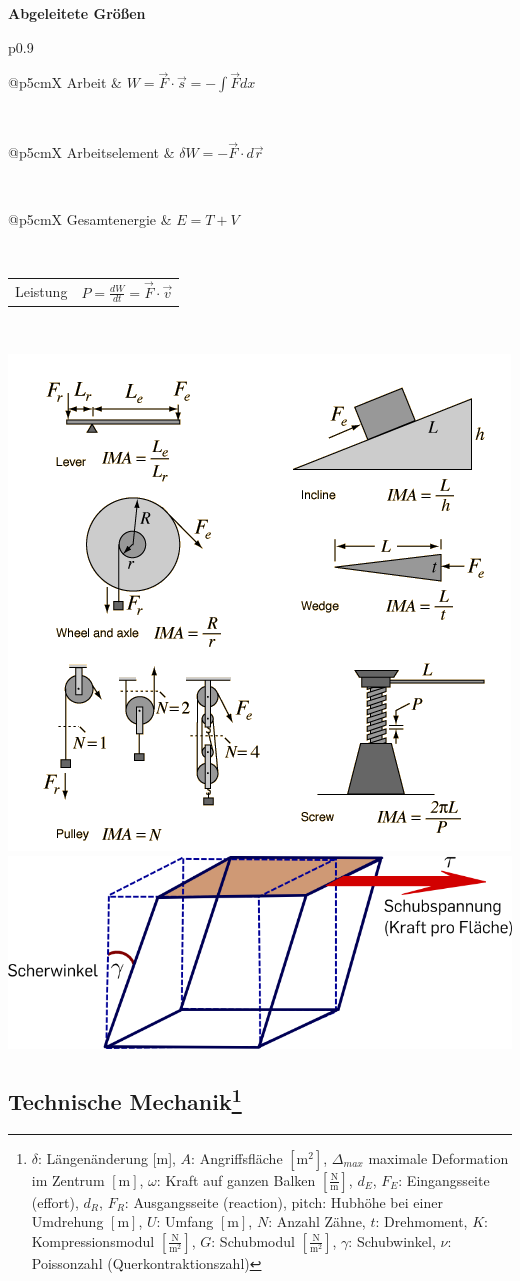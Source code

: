 \documentclass[12pt,a4paper, twoside]{article}
\makeatletter
\renewcommand{\d}[2]{\frac{d #1}{d #2}}
\renewcommand{\=}[1]{\stackrel{#1}{=}}
\theoremstyle{definition}
\theoremstyle{remark}
\newcommand{\concept}[2]{%
\noindent
\begin{framed}
\noindent\textbf{#1}
\par\begin{tabular}{p{0.9\linewidth}}
#2
\end{tabular}
\end{framed}
}
\newcommand{\f}[2]{%
\noindent\begin{tabularx}{\linewidth}{@{}p{5cm}X}
#1 & $#2$
\end{tabularx}}
\makeatother
\begin{document}
\concept{Abgeleitete Größen}{

\f{Arbeit}{W = \vec{F} \cdot \vec{s} = -\int \vec{F} dx}\\
\f{Arbeitselement}{\delta W = -\vec{F} \cdot d\vec{r}}\\
\f{Gesamtenergie}{E = T + V}\\
\f{Leistung}{P = \d{W}{t} = \vec{F} \cdot \vec{v}}\\
}

\includegraphics[width=0.5\linewidth]{pic/simplemach.png}
\includegraphics[width=0.5\linewidth]{pic/schubmodul.png}

\newpage
\subsection[Technische Mechanik]{Technische Mechanik\let\thefootnote\relax\footnote{$\delta$: Längenänderung [m], $A$: Angriffsfläche $[\text{m}^2]$, $\Delta_{max}$ maximale Deformation im Zentrum $[\text{m}]$, $\omega$: Kraft auf ganzen Balken $[\frac{\text{N}}{\text{m}}]$, $d_E$, $F_E$: Eingangsseite (effort), $d_R$, $F_R$: Ausgangsseite (reaction), pitch: Hubhöhe bei einer Umdrehung $[\text{m}]$, $U$: Umfang $[\text{m}]$, $N$: Anzahl Zähne, $t$: Drehmoment, $K$: Kompressionsmodul $[\frac{\text{N}}{\text{m}^2}]$, $G$: Schubmodul $[\frac{\text{N}}{\text{m}^2}]$, $\gamma$: Schubwinkel, $\nu$: Poissonzahl (Querkontraktionszahl)}}
\end{document}
